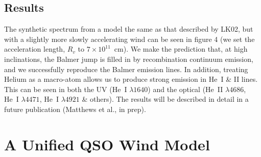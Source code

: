 \documentclass[useAMS,usenatbib,onecolumn]{mn2e2}
\begin{document}


\subsection{Results}

The synthetic spectrum from a model the same as that described by LK02, but with a slightly more
slowly accelerating wind can be seen in figure 4 (we set the acceleration length, $R_v$ to $7\times10^{11}$~cm). 
We make the prediction that, at high inclinations, the Balmer jump is filled in by recombination continuum emission, and 
we successfully reproduce the Balmer emission lines. In addition, treating Helium as a macro-atom allows 
us to produce strong emission in He~\textsc{I} \& \textsc{II} lines. This can be seen in both the UV (He~\textsc{I} $\lambda1640$)
and the optical (He~\textsc{II} $\lambda4686$, He~\textsc{I} $\lambda4471$, He~\textsc{I} $\lambda4921$ \& others).
The results will be described in detail in a future publication (Matthews et al., in prep).





\section{A Unified QSO Wind Model}
\end{document}
